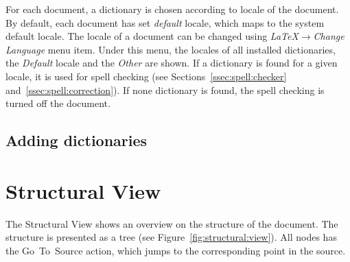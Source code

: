 \documentclass{article}
\begin{document}
For each document, a dictionary is chosen according to locale of the document.
By default, each document has set \emph{default} locale, which maps to the
system default locale. The locale of a document can be changed using
\emph{LaTeX$\rightarrow$Change Language} menu item. Under this menu, the locales
of all installed dictionaries, the \emph{Default} locale and the \emph{Other} are
shown. If a dictionary is found for a given locale, it is used for spell checking
(see Sections~\ref{ssec:spell:checker} and~\ref{ssec:spell:correction}).
If none dictionary is found, the spell checking is turned off the document.


\subsection{Adding dictionaries}


\section{Structural View}

\label{sec:structural:view}

The Structural View shows an overview on the structure of the document.
The structure is presented as a tree (see Figure~\ref{fig:structural:view}).
All nodes has the
Go~To~Source action, which jumps to the corresponding point in the source.
\end{document}
